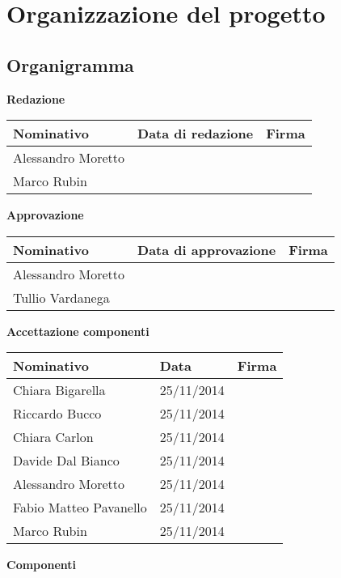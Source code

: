 	\section{Organizzazione del progetto}
	\subsection{Organigramma}
	
\textbf{Redazione}
\begin{center}
	\begin{tabular}{ | p{4cm} | p{3.5cm} | p{4cm} |}
	\hline
     Nominativo & Data di redazione & Firma \\ \hline
     Alessandro Moretto & & \\ \hline
     Marco Rubin & & \\ \hline
     \end{tabular}
	\end{center}
\textbf{Approvazione}
	\begin{center}
	\begin{tabular}{ | p{4cm} | p{3.5cm} | p{4cm} |}
	\hline
     Nominativo & Data di approvazione & Firma \\ \hline
     Alessandro Moretto & & \\ \hline
     Tullio Vardanega & & \\ \hline
     \end{tabular}
	\end{center}
\textbf{Accettazione componenti}
	\begin{center}
	\begin{tabular}{ | p{4cm} | p{2.5cm} | p{5cm} |}
	\hline
     Nominativo & Data & Firma \\ \hline
     Chiara Bigarella & 25/11/2014 & \\ \hline
     Riccardo Bucco & 25/11/2014 & \\ \hline
     Chiara Carlon & 25/11/2014 & \\ \hline
     Davide Dal Bianco & 25/11/2014 & \\ \hline
     Alessandro Moretto & 25/11/2014 & \\ \hline
     Fabio Matteo Pavanello & 25/11/2014 & \\ \hline
     Marco Rubin & 25/11/2014 & \\ \hline
     \end{tabular}
	\end{center}
	\textbf{Componenti}

